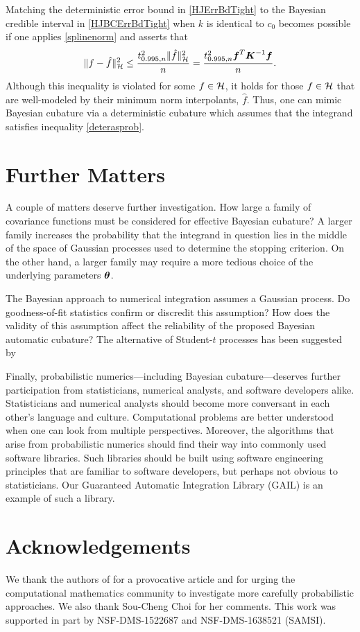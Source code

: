 \documentclass[sts]{imsart}
\numberwithin{equation}{section}
\theoremstyle{plain}
\newcommand{\calH}{\mathcal{H}}
\newcommand{\BOGOS}{\citetalias{BriEtal18a}}%
\begin{document}
Matching the deterministic error bound in \eqref{HJErrBdTight} to the Bayesian credible interval in  \eqref{HJBCErrBdTight} when  $k$ is identical to $c_0$ becomes possible if one applies \eqref{splinenorm} and asserts that 
\begin{equation}
\label{deterasprob}
\lVert f - \hat{f} \rVert_{\calH}^2 \le \frac{ t_{0.995,n}^2 \lVert \hat{f} \rVert^2_{\calH}}{n} = \frac{t_{0.995,n}^2 \vf^T \vK^{-1} \vf}{n}.
\end{equation}
Although this inequality is violated for some $f \in \mathcal{H}$, it holds for those $f \in \mathcal{H}$ that are well-modeled by their minimum norm interpolants, $\hat{f}$.  Thus, one can mimic Bayesian cubature via a deterministic cubature which assumes that the integrand satisfies inequality \eqref{deterasprob}.


\section{Further Matters}

A couple of matters deserve further investigation.  How large a family of covariance functions must be considered for effective Bayesian cubature?  A larger family increases the probability that the integrand in question lies in the middle of the space of Gaussian processes used to determine the stopping criterion.  On the other hand, a larger family may require a more tedious choice of the underlying parameters $\boldsymbol{\theta}$.

The Bayesian approach to numerical integration assumes a Gaussian process.  Do goodness-of-fit statistics confirm or discredit this assumption?  How does the validity of this assumption affect the reliability of the proposed Bayesian automatic cubature?  The alternative of Student-$t$ processes has been suggested by \cite{ShaWilGha14a}

Finally, probabilistic numerics---including Bayesian cubature---deserves further participation from statisticians, numerical analysts, and software developers alike.  Statisticians and numerical analysts should become more conversant in each other's language and culture.  Computational problems are better understood when one can look from multiple perspectives.  Moreover, the algorithms that arise from probabilistic numerics should find their way into commonly used software libraries.  Such libraries should be built using  software engineering principles that are familiar to software developers, but perhaps not obvious to statisticians. Our Guaranteed Automatic Integration Library (GAIL) \cite{ChoEtal17b} is an example of such a library.




\section*{Acknowledgements}
We thank the authors of \BOGOS{} for a provocative article and for urging the computational mathematics community to investigate more carefully probabilistic approaches.  We also thank Sou-Cheng Choi for her comments. This work was supported in part by NSF-DMS-1522687 and NSF-DMS-1638521 (SAMSI).



\end{document}
